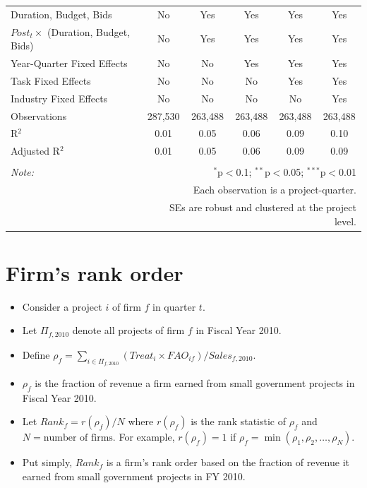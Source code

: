 \documentclass[
]{article}
\providecommand{\tightlist}{%
  \setlength{\itemsep}{0pt}\setlength{\parskip}{0pt}}
\begin{document}
\begin{table}[H]
\begin{tabular}{@{\extracolsep{-2pt}}lccccc}
Duration, Budget, Bids & No & Yes & Yes & Yes & Yes \\ 
$Post_t \times $  (Duration, Budget, Bids) & No & Yes & Yes & Yes & Yes \\ 
Year-Quarter Fixed Effects & No & No & Yes & Yes & Yes \\ 
Task Fixed Effects & No & No & No & Yes & Yes \\ 
Industry Fixed Effects & No & No & No & No & Yes \\ 
Observations & 287,530 & 263,488 & 263,488 & 263,488 & 263,488 \\ 
R$^{2}$ & 0.01 & 0.05 & 0.06 & 0.09 & 0.10 \\ 
Adjusted R$^{2}$ & 0.01 & 0.05 & 0.06 & 0.09 & 0.09 \\ 
\hline 
\hline \\[-1.8ex] 
\textit{Note:}  & \multicolumn{5}{r}{$^{*}$p$<$0.1; $^{**}$p$<$0.05; $^{***}$p$<$0.01} \\ 
 & \multicolumn{5}{r}{Each observation is a project-quarter.} \\ 
 & \multicolumn{5}{r}{SEs are robust and clustered at the project level.} \\ 
\end{tabular} 
\end{table}

\hypertarget{firms-rank-order}{%
\section{Firm's rank order}\label{firms-rank-order}}

\begin{itemize}
\tightlist
\item
  Consider a project \(i\) of firm \(f\) in quarter \(t\).
\item
  Let \(\Pi_{f,2010}\) denote all projects of firm \(f\) in Fiscal Year
  2010.
\item
  Define
  \(\rho_f = \sum_{i \in \Pi_{f,2010}} (Treat_i \times FAO_{if})/Sales_{f,\text{2010}}\).
\item
  \(\rho_f\) is the fraction of revenue a firm earned from small
  government projects in Fiscal Year 2010.
\item
  Let \(Rank_f = r(\rho_f)/N\) where \(r(\rho_f)\) is the rank statistic
  of \(\rho_{f}\) and \(N = \text{number of firms}.\) For example,
  \(r(\rho_f)=1\) if \(\rho_f=\min(\rho_1,\rho_2,\ldots,\rho_N)\).
\item
  Put simply, \(Rank_f\) is a firm's rank order based on the fraction of
  revenue it earned from small government projects in FY 2010.
\end{itemize}
\end{document}
